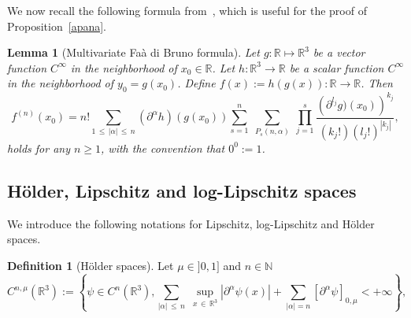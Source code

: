 \documentclass[10pt]{amsart}
\newtheorem{lemm}[theo]{Lemma}\newtheorem{prop}[theo]{Proposition}\newtheorem{coro}[theo]{Corollary}\newtheorem{conj}[theo]{Conjecture}
\theoremstyle{definition}\newtheorem{defi}[theo]{Definition}\newtheorem{rema}[theo]{Remark}\newtheorem{exam}[theo]{Example}\newtheorem{exem}[theo]{Example}\newtheorem{nota}[theo]{Notation}
\newcommand{\R}{\mathbb{R}}
\newcommand{\N}{\mathbb{N}}
\renewcommand{\leq}{\leqslant}
\renewcommand{\geq}{\geqslant}
\begin{document}
We now recall the following formula from~\cite[Lemma~3.2]{CVW}, which is useful for the proof of Proposition~\ref{apana}.


\begin{lemm}[Multivariate Faà di Bruno formula]\label{Lemme_FDB}
Let $g:\R \mapsto \R^3$ be a vector function $ C^\infty$ in the neighborhood of $x_0 \in \R$. Let $h : \R^3 \to \R$ be a scalar function $ C^\infty$ in the neighborhood of $y_0=g(x_0)$. Define $f(x):=h(g(x)): \R \to \R$. Then
\begin{equation}\label{FDB_formula}
f^{(n)}(x_0)= n! \sum_{1\,\leq\,|\alpha|\,\leq\,n} (\partial^\alpha h)(g(x_0))
\sum^n_{s=1}\;\sum_{P_s(n,\alpha)}\;\prod^s_{j=1}
\frac{\left(\partial^{l_j} g)(x_0)\right)^{k_j}}{(k_j!) (l_j!)^{|k_j|}},
\end{equation}
holds for any $n\geq 1$, with the convention that $0^0:=1$.
\end{lemm}

\subsection{H\"older, Lipschitz and log-Lipschitz spaces} We introduce the following notations for Lipschitz, log-Lipschitz and H\"older spaces.
\begin{defi}[H\"older spaces]
Let $ \mu \in]0,1]$ and $n\in \N $
\[
C^{n,\mu}\left(\R^3\right):= \left\{ \psi \in C^n(\R^3), \sum_{|\alpha|\,\leq\,n}\;
\underset{x\,\in\,\R^3}{\sup}\left|\partial^\alpha \psi(x)\right|+
\sum_{|\alpha|= n}[\partial^\alpha \psi]_{0,\mu}<+\infty \right\},
\]
\end{defi}
\end{document}
